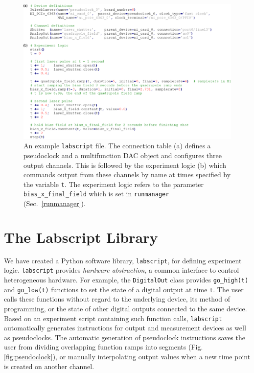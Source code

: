 \begin{figure}%
\includegraphics{figures/software/labscript_example.eps}%
\caption{An example \texttt{labscript} file.
The connection table (a) defines a pseudoclock and a multifunction DAC object and configures three output channels.
This is followed by the experiment logic (b) which commands output from these channels by name at times specified by the variable \texttt{t}.
The experiment logic refers to the parameter \texttt{bias\_x\_final\_field} which is set in \texttt{runmanager} (Sec.~\ref{runmanager}).
}%
\label{fig:labscript}%
\end{figure}


\section{The Labscript Library\label{metalanguage}}
We have created a Python software library, \texttt{labscript}, for defining experiment logic.
\texttt{labscript} provides \textit{hardware abstraction}, a common interface to control heterogeneous hardware.
For example, the \texttt{DigitalOut} class provides \texttt{go\_high(t)} and \texttt{go\_low(t)} functions to set the state of a digital output at time \texttt{t}.
The user calls these functions without regard to the underlying device, its method of programming, or the state of other digital outputs connected to the same device.
Based on an experiment script containing such function calls, \texttt{labscript} automatically generates instructions for output and measurement devices as well as pseudoclocks.
The automatic generation of pseudoclock instructions saves the user from dividing overlapping function ramps into segments (Fig. \ref{fig:pseudoclock}), or manually interpolating output values when a new time point is created on another channel.

